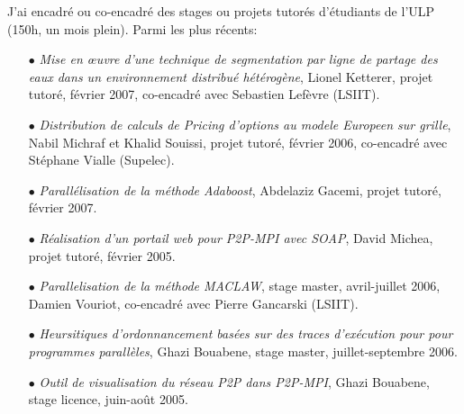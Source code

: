 J'ai encadré ou co-encadré des stages ou projets tutorés d'étudiants de l'ULP (150h, un mois plein). 
Parmi les plus récents:\\
\begin{itemize}
\item[$\bullet$]  {\it Mise en {\oe}uvre d'une technique de segmentation par ligne de partage des eaux dans un environnement distribué hétérogène}, Lionel Ketterer, projet tutoré, février 2007, co-encadré avec Sebastien Lefèvre (LSIIT).
\item[$\bullet$]  {\it Distribution de calculs de Pricing d'options au modele Europeen sur grille}, Nabil Michraf et Khalid Souissi, projet tutoré, février 2006, co-encadré avec Stéphane Vialle (Supelec).

\item[$\bullet$]  {\it Parallélisation de la méthode Adaboost}, Abdelaziz Gacemi, projet tutoré, février 2007.
\item[$\bullet$] {\it Réalisation d'un portail web pour P2P-MPI avec SOAP}, David Michea, projet tutoré, février 2005.

\item[$\bullet$] {\it Parallelisation de la méthode MACLAW}, stage master, avril-juillet 2006, Damien Vouriot, co-encadré avec Pierre Gancarski (LSIIT).
\item[$\bullet$] {\it Heursitiques d'ordonnancement basées sur des traces d'exécution pour pour programmes parallèles}, Ghazi Bouabene, stage master, juillet-septembre 2006.
\item[$\bullet$]  {\it Outil de visualisation du réseau P2P dans P2P-MPI}, Ghazi Bouabene, stage licence, juin-août 2005.
\end{itemize}

